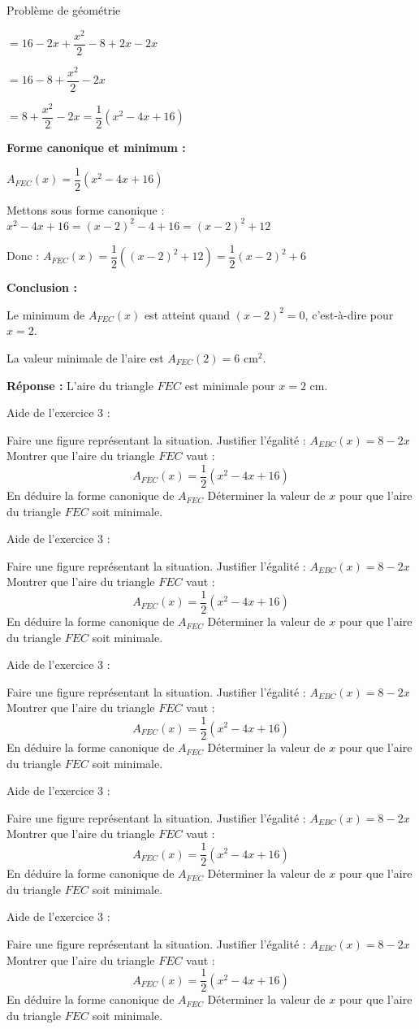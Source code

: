 \begin{EXO}{Problème de géométrie}{}
\begin{tcbenumerate}[2]
\begin{MultiColonnes}{2}
$= 16 - 2x + \dfrac{x^2}{2} - 8 + 2x - 2x$

$= 16 - 8 + \dfrac{x^2}{2} - 2x$

$= 8 + \dfrac{x^2}{2} - 2x = \dfrac{1}{2}(x^2 - 4x + 16)$
\end{MultiColonnes}



\tcbitem \textbf{Forme canonique et minimum :} 

$A_{FEC}(x) = \dfrac{1}{2}(x^2 - 4x + 16)$

Mettons sous forme canonique :
$x^2 - 4x + 16 = (x-2)^2 - 4 + 16 = (x-2)^2 + 12$

Donc : $A_{FEC}(x) = \dfrac{1}{2}((x-2)^2 + 12) = \dfrac{1}{2}(x-2)^2 + 6$


\tcbitem \textbf{Conclusion :} 

Le minimum de $A_{FEC}(x)$ est atteint quand $(x-2)^2 = 0$, c'est-à-dire pour $x = 2$.

La valeur minimale de l'aire est $A_{FEC}(2) = 6$ cm$^2$.

\textbf{Réponse :} L'aire du triangle $FEC$ est minimale pour $x = 2$ cm.
\end{tcbenumerate}
\end{EXO}

\newpage
\newcommand{\aideExoTrois}{
    \begin{bfbox}{Aide de l'exercice 3 :}
        \begin{tcbenumerate}[2]
            \tcbitem Faire une figure représentant la situation.
            \tcbitem Justifier l'égalité : $A_{EBC}(x)=8-2x$
            \tcbitem Montrer que l'aire du triangle $FEC$ vaut : $$A_{FEC}(x)=\dfrac{1}{2}\left(x^2-4x+16\right)$$
            \tcbitem En déduire la forme canonique de $A_{FEC}$
            \tcbitem[raster multicolumn=2] Déterminer la valeur de $x$ pour que l'aire du triangle $FEC$ soit minimale.
        \end{tcbenumerate}
    \end{bfbox}
}

\aideExoTrois
\vfill
\aideExoTrois
\vfill
\aideExoTrois
\vfill
\aideExoTrois
\vfill
\aideExoTrois
\vfill
\phantom{a}
